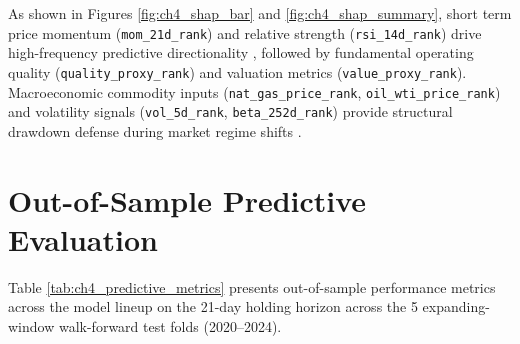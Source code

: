 As shown in Figures \ref{fig:ch4_shap_bar} and \ref{fig:ch4_shap_summary}, short term price momentum (\texttt{mom\_21d\_rank}) and relative strength (\texttt{rsi\_14d\_rank}) drive high-frequency predictive directionality \citep{jegadeesh1993returns, carhart1997on}, followed by fundamental operating quality (\texttt{quality\_proxy\_rank}) and valuation metrics (\texttt{value\_proxy\_rank}). Macroeconomic commodity inputs (\texttt{nat\_gas\_price\_rank}, \texttt{oil\_wti\_price\_rank}) and volatility signals (\texttt{vol\_5d\_rank}, \texttt{beta\_252d\_rank}) provide structural drawdown defense during market regime shifts \citep{novy2013other, fama2015five}.

\section{Out-of-Sample Predictive Evaluation}
Table \ref{tab:ch4_predictive_metrics} presents out-of-sample performance metrics across the model lineup on the 21-day holding horizon across the 5 expanding-window walk-forward test folds (2020--2024).

\begin{table}[htbp]
\centering
\caption{Out-of-Sample Predictive Performance Metrics (2020--2024 Test Folds -- Master Panel 53 Features)}
\label{tab:ch4_predictive_metrics}
\end{table}

